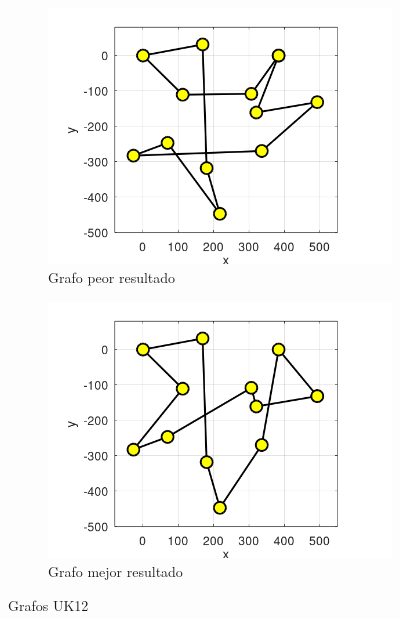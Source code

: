 \documentclass[12pt, a4paper]{article}
\begin{document}
\begin{figure}[H]
    \centering
    \begin{subfigure}[b]{0.45\textwidth}
        \centering
        \includegraphics[width=\textwidth]{img/uk12-worst-graph.png}
        \caption{Grafo peor resultado}
        \label{fig:uk12-worst-graph}
    \end{subfigure}
    \hfill
    \begin{subfigure}[b]{0.45\textwidth}
        \centering
        \includegraphics[width=\textwidth]{img/uk12-best-graph.png}
        \caption{Grafo mejor resultado}
        \label{fig:uk12-best-graph}
    \end{subfigure}
    \caption{Grafos UK12}
    \label{fig:uk12-graphs}
\end{figure}
\end{document}
